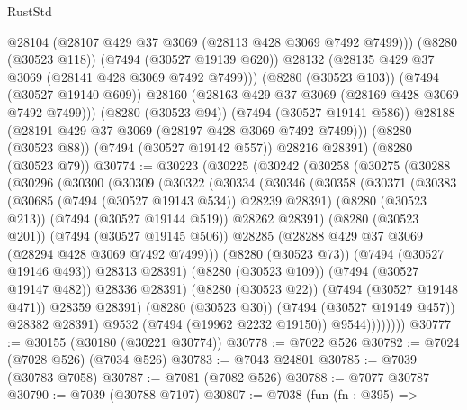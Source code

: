 \begin{lexlean}{RustStd}
\begin{coremodule}
              @28104
              (@28107 @429 @37 @3069 (@28113 @428 @3069 @7492 @7499)))
            (@8280 (@30523 @118))
            (@7494 (@30527 @19139 @620))
            @28132
            (@28135 @429 @37 @3069 (@28141 @428 @3069 @7492 @7499)))
          (@8280 (@30523 @103))
          (@7494 (@30527 @19140 @609))
          @28160
          (@28163 @429 @37 @3069 (@28169 @428 @3069 @7492 @7499)))
        (@8280 (@30523 @94))
        (@7494 (@30527 @19141 @586))
        @28188
        (@28191 @429 @37 @3069 (@28197 @428 @3069 @7492 @7499)))
      (@8280 (@30523 @88))
      (@7494 (@30527 @19142 @557))
      @28216
      @28391)
    (@8280 (@30523 @79))
@30774 := @30223
    (@30225
      (@30242
        (@30258
          (@30275
            (@30288
              (@30296
                (@30300
                  (@30309
                    (@30322
                      (@30334
                        (@30346
                          (@30358
                            (@30371
                              (@30383
                                (@30685 (@7494 (@30527 @19143 @534)) @28239 @28391)
                                (@8280 (@30523 @213))
                                (@7494 (@30527 @19144 @519))
                                @28262
                                @28391)
                              (@8280 (@30523 @201))
                              (@7494 (@30527 @19145 @506))
                              @28285
                              (@28288 @429 @37 @3069 (@28294 @428 @3069 @7492 @7499)))
                            (@8280 (@30523 @73))
                            (@7494 (@30527 @19146 @493))
                            @28313
                            @28391)
                          (@8280 (@30523 @109))
                          (@7494 (@30527 @19147 @482))
                          @28336
                          @28391)
                        (@8280 (@30523 @22))
                        (@7494 (@30527 @19148 @471))
                        @28359
                        @28391)
                      (@8280 (@30523 @30))
                      (@7494 (@30527 @19149 @457))
                      @28382
                      @28391)
                    @9532
                    (@7494 (@19962 @2232 @19150))
                    @9544))))))))
@30777 := @30155 (@30180 (@30221 @30774))
@30778 := @7022 @526
@30782 := @7024 (@7028 @526) (@7034 @526)
@30783 := @7043 @24801
@30785 := @7039 (@30783 @7058)
@30787 := @7081 (@7082 @526)
@30788 := @7077 @30787
@30790 := @7039 (@30788 @7107)
@30807 := @7038
    (fun (fn : @395) =>

\end{coremodule}
\end{lexlean}

